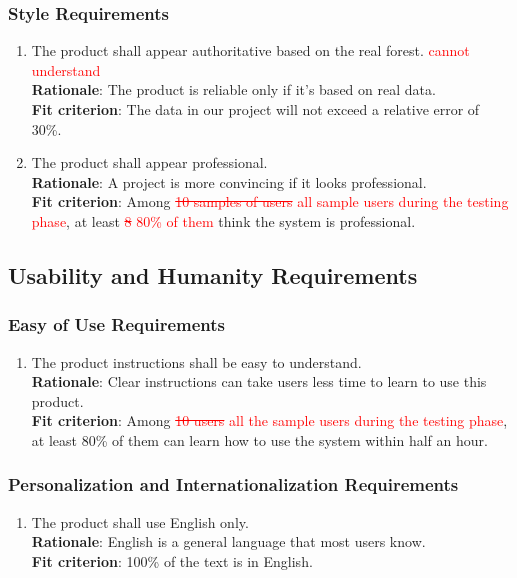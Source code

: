 \documentclass{article}
\begin{document}
\subsubsection{Style Requirements}
\begin{enumerate}[LF2.1]
    \item The product shall appear authoritative based on the real forest. \textcolor{red}{cannot
    understand}\\
    \textbf{Rationale}: The product is reliable only if it's based on real data.\\
    \textbf{Fit criterion}: The data in our project will not exceed a relative error of 30\%.
    
    \item The product shall appear professional.\\
    \textbf{Rationale}: A project is more convincing if it looks professional.\\
    \textbf{Fit criterion}: Among \textcolor{red}{\st{10 samples of users} all sample users during the 
    testing phase}, at least \textcolor{red}{\st{8} 80\% of them} think the system is professional.
\end{enumerate}
\subsection{Usability and Humanity Requirements}
\subsubsection{Easy of Use Requirements}
\begin{enumerate}[UH1.1]
    \item The product instructions shall be easy to understand.\\
    \textbf{Rationale}: Clear instructions can take users less time to learn to use this product.\\
    \textbf{Fit criterion}: Among \textcolor{red}{\st{10 users} all the sample users during the 
    testing phase}, at least 80\% of them can learn how to use the system within half an hour.
\end{enumerate}
\subsubsection{Personalization and Internationalization Requirements}
\begin{enumerate}[UH2.1]
    \item The product shall use English only.\\
    \textbf{Rationale}: English is a general language that most users know.\\
    \textbf{Fit criterion}: 100\% of the text is in English.
\end{enumerate}
\end{document}
